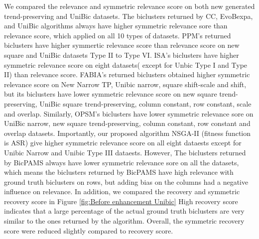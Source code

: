 We compared the relevance and symmetric relevance score  on both new generated trend-preserving and UniBic datasets. The biclusters returned by CC, EvoBexpa, and UniBic algorithms always have higher symmetric relevance sore than relevance score, which applied on all 10 types of datasets. PPM's returned biclusters have higher symmertic relevance score than relevance score on new square and UniBic datasets Type II to Type VI. ISA's biclusters have higher symmetric relevance score on eight datasets( except for Unbic Type I and Type II) than relevance score. FABIA's returned biclusters obtained higher symmetric relevance score on New Narrow TP, Unibic narrow, square shift-scale and shift, but its biclusters have lower symmetric relevance score on new square trend-preserving, UniBic square trend-preserving, column constant, row constant, scale and overlap. Similarly, OPSM's biclusters have lower symmetric relevance sore on UniBic narrow, new square trend-preserving, column constant, row constant and overlap datasets. Importantly, our proposed algorithm NSGA-II (fitness function is ASR) give higher symmetric relevance score on all eight dataests except for Unibic Narrow and Unibic Type III dataests. However, The biclusters returned by BicPAMS always have lower symmetric relevance sore on all the datasets, which means the biclusters returned by BicPAMS have high relevance with ground truth biclusters on rows, but adding bias on the columns had a negative influence on relevance. In addition, we compared the recovery and symmetric recovery score in Figure \ref{fig:Before enhancement Unibic} High recovery score indicates that a large percentage of the actual ground truth biclusters are very similar to the ones returned by the algorithm. Overall, the symmetric recovery score were reduced slightly compared to recovery score.

